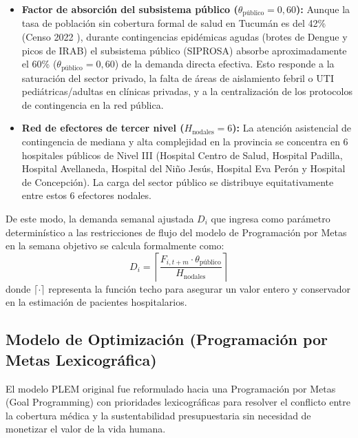 \documentclass[conference]{IEEEtran}
\begin{document}
\begin{itemize}
    \item \textbf{Factor de absorción del subsistema público ($\theta_{\text{público}} = 0{,}60$):} Aunque la tasa de población sin cobertura formal de salud en Tucumán es del 42\% (Censo 2022 \cite{ref12}), durante contingencias epidémicas agudas (brotes de Dengue y picos de IRAB) el subsistema público (SIPROSA) absorbe aproximadamente el 60\% ($\theta_{\text{público}} = 0{,}60$) de la demanda directa efectiva. Esto responde a la saturación del sector privado, la falta de áreas de aislamiento febril o UTI pediátricas/adultas en clínicas privadas, y a la centralización de los protocolos de contingencia en la red pública.
    \item \textbf{Red de efectores de tercer nivel ($H_{\text{nodales}} = 6$):} La atención asistencial de contingencia de mediana y alta complejidad en la provincia se concentra en 6 hospitales públicos de Nivel III (Hospital Centro de Salud, Hospital Padilla, Hospital Avellaneda, Hospital del Niño Jesús, Hospital Eva Perón y Hospital de Concepción). La carga del sector público se distribuye equitativamente entre estos 6 efectores nodales.
\end{itemize}

De este modo, la demanda semanal ajustada $D_i$ que ingresa como parámetro determinístico a las restricciones de flujo del modelo de Programación por Metas en la semana objetivo se calcula formalmente como:
\begin{equation}
    D_i = \left\lceil \frac{F_{i, t+m} \cdot \theta_{\text{público}}}{H_{\text{nodales}}} \right\rceil
\end{equation}
donde $\lceil \cdot \rceil$ representa la función techo para asegurar un valor entero y conservador en la estimación de pacientes hospitalarios.

\subsection{Modelo de Optimización (Programación por Metas Lexicográfica)}
El modelo PLEM original fue reformulado hacia una Programación por Metas (Goal Programming) con prioridades lexicográficas \cite{refGP} para resolver el conflicto entre la cobertura médica y la sustentabilidad presupuestaria sin necesidad de monetizar el valor de la vida humana.
\end{document}
